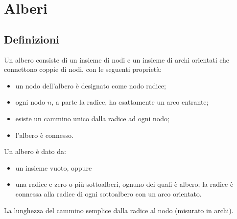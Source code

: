 
\ifsubfile
\pagestyle{plain}
\setcounter{chapter}{5}
\usepackage[
    parfill=30pt, %
]{parskip}



\fi
\chapter{Alberi}


\section{Definizioni}

\begin{definition}
Un albero consiste di un insieme di nodi e un insieme di archi orientati che connettono coppie di nodi, con le seguenti proprietà:
\begin{itemize}
	\item un nodo dell'albero è designato come nodo radice;
	\item ogni nodo \(n\), a parte la radice, ha esattamente un arco entrante;
	\item esiste un cammino unico dalla radice ad ogni nodo;
	\item l'albero è connesso.
\end{itemize}
\end{definition}

\begin{definition}
Un albero è dato da:
\begin{itemize}
	\item un insieme vuoto, oppure
	\item una radice e zero o più sottoalberi, ognuno dei quali è albero; la radice è connessa alla radice di ogni sottoalbero con un arco orientato.
\end{itemize}
\end{definition}

\begin{definition}
La lunghezza del cammino semplice dalla radice al nodo (misurato in archi).
\end{definition}

